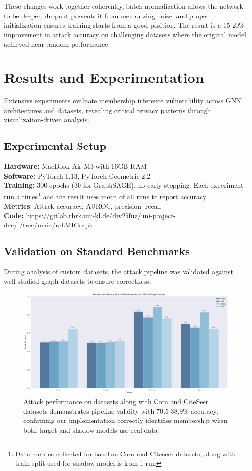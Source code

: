 \documentclass{article}
\begin{document}
These changes work together coherently, batch normalization allows the network to be deeper, dropout prevents it from memorizing noise, and proper initialization ensures training starts from a good position. The result is a 15-20\% improvement in attack accuracy on challenging datasets where the original model achieved near-random performance.

\section{Results and Experimentation}
\label{results}
Extensive experiments evaluate membership inference vulnerability across GNN architectures and datasets, revealing critical privacy patterns through visualization-driven analysis.

\subsection{Experimental Setup}
\textbf{Hardware:} MacBook Air M3 with 16GB RAM\\
\textbf{Software:} PyTorch 1.13, PyTorch Geometric 2.2\\
\textbf{Training:} 300 epochs (30 for GraphSAGE), no early stopping. Each experiment run 5 times\footnote{Data metrics collected for baseline Cora and Citeseer datasets, along with train split used for shadow model is from 1 run} and the result uses mean of all runs to report accuracy\\
\textbf{Metrics:} Attack accuracy, AUROC, precision, recall\\
\textbf{Code:} \url{https://gitlab.rhrk.uni-kl.de/div26fuz/uni-project-dec/-/tree/main/rebMIGraph}

\subsection{Validation on Standard Benchmarks}
During analysis of custom datasets, the attack pipeline was validated against well-studied graph datasets to ensure correctness.

\begin{figure}[H]
\centering
\includegraphics[width=\textwidth]{../Results/visualizations/comprehensive_datasets_comparison.png}
\caption{Attack performance on datasets along with Cora and CiteSeer datasets demonstrates pipeline validity with 70.5-88.9\% accuracy, confirming our implementation correctly identifies membership when both target and shadow models use real data.}
\label{fig:baseline}
\end{figure}
\end{document}
